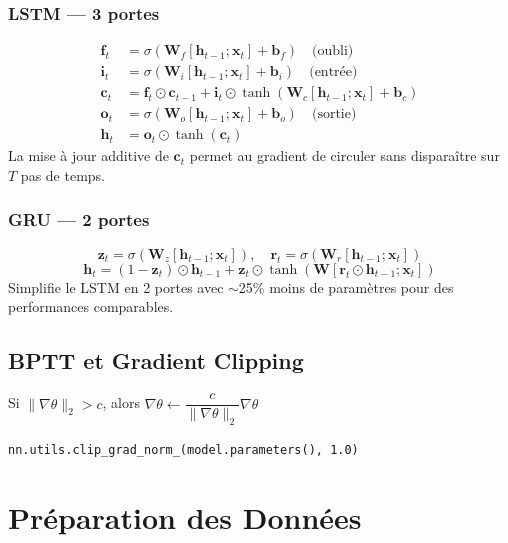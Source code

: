 \documentclass[12pt,a4paper]{report}
\begin{document}
\subsubsection{LSTM --- 3 portes}
\begin{formulebox}
\begin{align*}
  \mathbf{f}_t &= \sigma(\mathbf{W}_f[\mathbf{h}_{t-1};\mathbf{x}_t]+\mathbf{b}_f)
  \quad\text{(oubli)}\\
  \mathbf{i}_t &= \sigma(\mathbf{W}_i[\mathbf{h}_{t-1};\mathbf{x}_t]+\mathbf{b}_i)
  \quad\text{(entrée)}\\
  \mathbf{c}_t &= \mathbf{f}_t\odot\mathbf{c}_{t-1}
  + \mathbf{i}_t\odot\tanh(\mathbf{W}_c[\mathbf{h}_{t-1};\mathbf{x}_t]+\mathbf{b}_c)\\
  \mathbf{o}_t &= \sigma(\mathbf{W}_o[\mathbf{h}_{t-1};\mathbf{x}_t]+\mathbf{b}_o)
  \quad\text{(sortie)}\\
  \mathbf{h}_t &= \mathbf{o}_t\odot\tanh(\mathbf{c}_t)
\end{align*}
La mise à jour additive de $\mathbf{c}_t$ permet au gradient de circuler
sans disparaître sur $T$ pas de temps.
\end{formulebox}

\subsubsection{GRU --- 2 portes}
\[
  \mathbf{z}_t = \sigma(\mathbf{W}_z[\mathbf{h}_{t-1};\mathbf{x}_t]),\quad
  \mathbf{r}_t = \sigma(\mathbf{W}_r[\mathbf{h}_{t-1};\mathbf{x}_t])
\]
\[
  \mathbf{h}_t = (1-\mathbf{z}_t)\odot\mathbf{h}_{t-1}
  + \mathbf{z}_t\odot\tanh(\mathbf{W}[\mathbf{r}_t\odot\mathbf{h}_{t-1};\mathbf{x}_t])
\]
Simplifie le LSTM en 2 portes avec $\sim$25\% moins de paramètres pour des performances comparables.

\subsection{BPTT et Gradient Clipping}
\begin{formulebox}[Gradient Clipping --- seuil = 1.0]
Si $\|\nabla\theta\|_2 > c$, alors
$\nabla\theta \leftarrow \dfrac{c}{\|\nabla\theta\|_2}\nabla\theta$

\texttt{nn.utils.clip\_grad\_norm\_(model.parameters(), 1.0)}
\end{formulebox}

\section{Préparation des Données}
\end{document}
